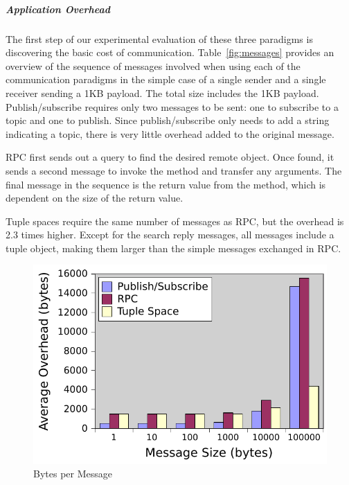 \subparagraph{Application Overhead}\label{sec:app_overhead}

The first step of our experimental evaluation of these three paradigms is discovering the basic cost of communication. Table~\ref{fig:messages} provides an overview of the sequence of messages involved when using each of the communication paradigms in the simple case of a single sender and a single receiver sending a 1KB payload. The total size includes the 1KB payload.
Publish/subscribe requires only two messages to be sent: one to subscribe to a topic and one to publish. Since publish/subscribe only needs to add a string indicating a topic, there is very little overhead added to the original message.

RPC first sends out a query to find the desired remote object. Once found, it sends a second message to invoke the method and transfer any arguments. The final message in the sequence is the return value from the method, which is dependent on the size of the return value.


Tuple spaces require the same number of messages as RPC, but the overhead is 2.3 times higher. Except for the search reply messages, all messages include a tuple object, making them larger than the simple messages exchanged in RPC.


\begin{figure}
\centering
\includegraphics{figures/message-overhead-bytes.pdf}
\caption{Bytes per Message}
\label{fig:overhead-bytes}
\end{figure}

